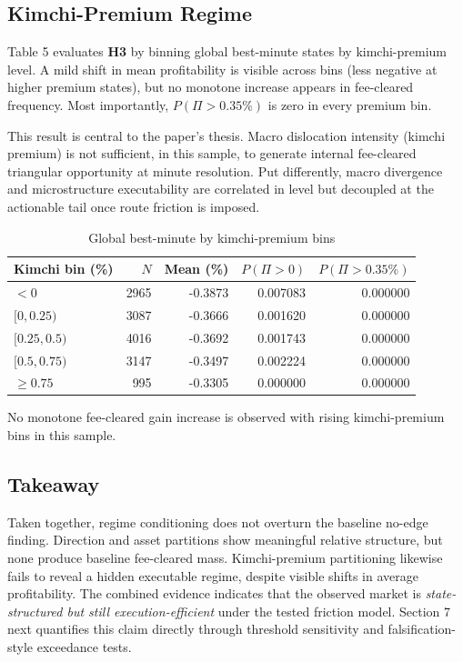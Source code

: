 \documentclass[11pt,a4paper]{article}
\begin{document}
\subsection{Kimchi-Premium Regime}
\noindent Table 5 evaluates \textbf{H3} by binning global best-minute states by kimchi-premium level. A mild shift in mean profitability is visible across bins (less negative at higher premium states), but no monotone increase appears in fee-cleared frequency. Most importantly, $P(\Pi>0.35\%)$ is zero in every premium bin.

\noindent This result is central to the paper's thesis. Macro dislocation intensity (kimchi premium) is not sufficient, in this sample, to generate internal fee-cleared triangular opportunity at minute resolution. Put differently, macro divergence and microstructure executability are correlated in level but decoupled at the actionable tail once route friction is imposed.

\begin{table}[H]
\centering
\caption{Global best-minute by kimchi-premium bins}
\begin{tabular}{l r r r r}
\toprule
Kimchi bin (\%) & $N$ & Mean (\%) & $P(\Pi>0)$ & $P(\Pi>0.35\%)$ \\
\midrule
$<0$ & 2965 & -0.3873 & 0.007083 & 0.000000 \\
$[0,0.25)$ & 3087 & -0.3666 & 0.001620 & 0.000000 \\
$[0.25,0.5)$ & 4016 & -0.3692 & 0.001743 & 0.000000 \\
$[0.5,0.75)$ & 3147 & -0.3497 & 0.002224 & 0.000000 \\
$\ge 0.75$ & 995 & -0.3305 & 0.000000 & 0.000000 \\
\bottomrule
\end{tabular}
\end{table}
No monotone fee-cleared gain increase is observed with rising kimchi-premium bins in this sample.

\subsection{Takeaway}
Taken together, regime conditioning does not overturn the baseline no-edge finding. Direction and asset partitions show meaningful relative structure, but none produce baseline fee-cleared mass. Kimchi-premium partitioning likewise fails to reveal a hidden executable regime, despite visible shifts in average profitability. The combined evidence indicates that the observed market is \emph{state-structured but still execution-efficient} under the tested friction model. Section 7 next quantifies this claim directly through threshold sensitivity and falsification-style exceedance tests.
\end{document}
